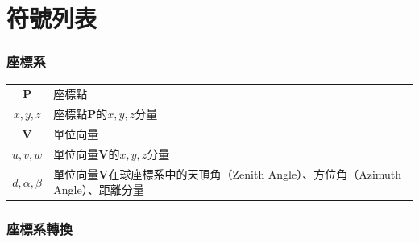 \chapter*{符號列表}
\label{chp:symbol}




\subsection*{座標系}

\begin{longtable}[l]{cl}
    $\boldsymbol{P}$ & 座標點\\
    $x,y,z$ & 座標點$\boldsymbol{P}$的$x,y,z$分量\\
    $\boldsymbol{V}$ & 單位向量\\
    $u,v,w$ & 單位向量$\boldsymbol{V}$的$x,y,z$分量\\
    $d,\alpha,\beta$ & 單位向量$\boldsymbol{V}$在球座標系中的天頂角（Zenith Angle）、方位角（Azimuth Angle）、距離分量\\
\end{longtable}





\onehalfspacing

\subsection*{座標系轉換}

